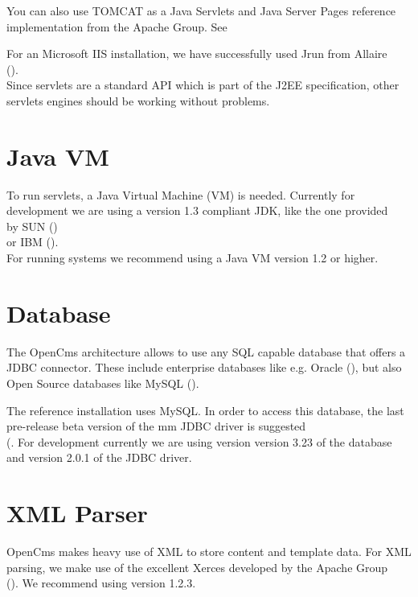 You can also use TOMCAT as a Java Servlets and Java Server Pages 
reference implementation from the Apache Group. See 

For an Microsoft IIS installation, we have successfully used Jrun from Allaire \\
().\\ 
Since servlets are a standard API which is part of the J2EE specification, 
other servlets engines should be working without problems.

\section{Java VM}
To run servlets, a Java Virtual Machine (VM) is needed. Currently for development we are using 
a version 1.3 compliant JDK, like the one provided \\
by SUN ()\\
or IBM ().\\
For running systems we recommend using a Java VM version 1.2 or higher.

\section{Database}
The OpenCms architecture allows to use any SQL capable database that offers a JDBC connector. 
These include enterprise databases like e.g. Oracle (),
but also Open Source databases like MySQL ().  

The reference installation uses MySQL. In order to access this database, the last pre-release 
beta version of the mm JDBC driver is suggested\\
(. For 
development currently we are using version version 3.23 of the database and version 2.0.1 of the 
JDBC driver.
							
\section{XML Parser}
OpenCms makes heavy use of XML to store content and template data. For XML parsing, we make use of 
the excellent Xerces developed by the Apache Group\\
().
We recommend using version 1.2.3. 


